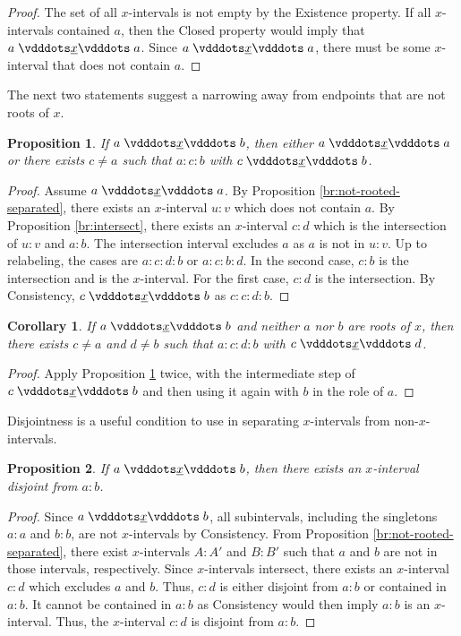 \documentclass[12pt]{article}
\newtheorem{corollary}{Corollary}[section]
\newtheorem{proposition}{Proposition}[section]
\begin{document}
\begin{proof}
    The set of all $x$-intervals is not empty by the Existence property. If all $x$-intervals contained $a$, then the Closed property would imply that $a \xrel a$. Since  \sout{$a \xrel a$}, there must be some $x$-interval that does not contain $a$. 
\end{proof}

The next two statements suggest a narrowing away from endpoints that are not roots of $x$. 

\begin{proposition}\label{br:something-inside}
    If $a \xrel b$, then either $a \xrel a$ or there exists $c \neq a$ such that $a : c : b$ with $c \xrel b$. 
\end{proposition}

\begin{proof}
    Assume \sout{$a \xrel a$}. By Proposition \ref{br:not-rooted-separated}, there exists an $x$-interval $u:v$ which does not contain $a$. By Proposition \ref{br:intersect}, there exists an $x$-interval  $c:d$ which is the intersection of $u:v$ and $a:b$. The intersection interval excludes $a$ as $a$ is not in $u:v$. Up to relabeling, the cases are $a:c:d:b$ or $a:c:b:d$. In the second case, $c:b$ is the intersection and is the $x$-interval. For the first case, $c:d$ is the intersection. By Consistency, $c \xrel b$ as $c:c:d:b$. 
\end{proof}

\begin{corollary}\label{br:doublesomething-inside}
    If $a \xrel b$ and neither $a$ nor $b$ are roots of $x$, then there exists $c \neq a$ and $d \neq b$ such that $a : c : d : b$ with $c \xrel d$. 
\end{corollary}

\begin{proof}
Apply Proposition \ref{br:something-inside} twice, with the intermediate step of $c \xrel b$ and then using it again with $b$ in the role of $a$. 
\end{proof}

Disjointness is a useful condition to use in separating $x$-intervals from non-$x$-intervals. 

\begin{proposition}\label{br:something-outside}
    If \sout{$a \xrel b$}, then there exists an $x$-interval disjoint from $a:b$.
\end{proposition}

\begin{proof}
    Since \sout{$a \xrel b$}, all subintervals, including the singletons $a:a$ and $b:b$, are not $x$-intervals by Consistency. From Proposition \ref{br:not-rooted-separated}, there exist $x$-intervals $A:A'$ and $B:B'$ such that $a$ and $b$ are not in those intervals, respectively. Since $x$-intervals intersect, there exists an $x$-interval $c:d$ which excludes $a$ and $b$. Thus, $c:d$ is either disjoint from $a:b$ or contained in $a:b$. It cannot be contained in $a:b$ as Consistency would then imply $a:b$ is an $x$-interval. Thus, the $x$-interval $c:d$ is disjoint from $a:b$.
\end{proof}
\end{document}
